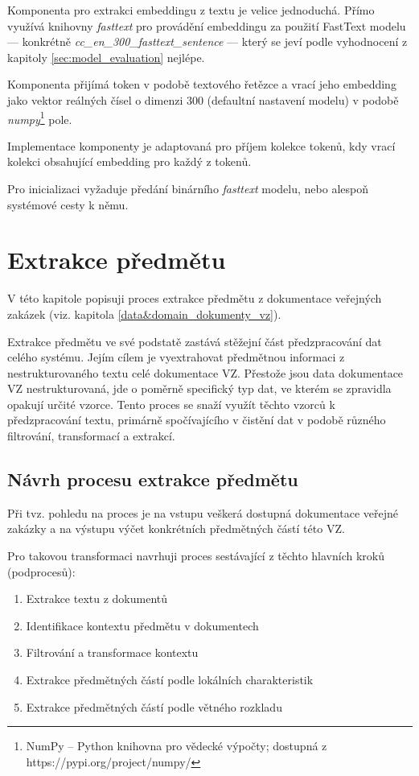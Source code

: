 \documentclass[thesis=M,czech]{FITthesis}[2019/12/23]
\begin{document}
Komponenta pro extrakci embeddingu z textu je velice jednoduchá. Přímo využívá knihovny \textit{fasttext} pro provádění embeddingu za použití FastText modelu --- konkrétně \textit{cc\_en\_300\_fasttext\_sentence} --- který se jeví podle vyhodnocení z kapitoly \ref{sec:model_evaluation} nejlépe.

Komponenta přijímá token v podobě textového řetězce a vrací jeho embedding jako vektor reálných čísel o dimenzi 300 (defaultní nastavení modelu) v podobě \textit{numpy}\footnote{NumPy -- Python knihovna pro vědecké výpočty;\newline
dostupná z https://pypi.org/project/numpy/} pole.

Implementace komponenty je adaptovaná pro příjem kolekce tokenů, kdy vrací kolekci obsahující embedding pro každý z tokenů.

Pro inicializaci vyžaduje předání binárního \textit{fasttext} modelu, nebo alespoň systémové cesty k němu.

\section{Extrakce předmětu}
\label{sec:subjextraction}

V této kapitole popisuji proces extrakce předmětu z dokumentace veřejných zakázek (viz. kapitola \ref{data&domain_dokumenty_vz}).

Extrakce předmětu ve své podstatě zastává stěžejní část předzpracování dat celého systému. Jejím cílem je vyextrahovat předmětnou informaci z nestrukturovaného textu celé dokumentace VZ. Přestože jsou data dokumentace VZ nestrukturovaná, jde o poměrně specifický typ dat, ve kterém se zpravidla opakují určité vzorce. Tento proces se snaží využít těchto vzorců k předzpracování textu, primárně spočívajícího v čistění dat v podobě různého filtrování, transformací a extrakcí.

\subsection{Návrh procesu extrakce předmětu}
\label{sec:subj_extraction_design}

Při tvz.  pohledu na proces je na vstupu veškerá dostupná dokumentace veřejné zakázky a na výstupu výčet konkrétních předmětných částí této VZ.

Pro takovou transformaci navrhuji proces sestávající z těchto hlavních kroků (podprocesů):
\begin{enumerate}
    \item Extrakce textu z dokumentů
    \item Identifikace kontextu předmětu v dokumentech
    \item Filtrování a transformace kontextu
    \item Extrakce předmětných částí podle lokálních charakteristik
    \item Extrakce předmětných částí podle větného rozkladu
\end{enumerate}
\end{document}
